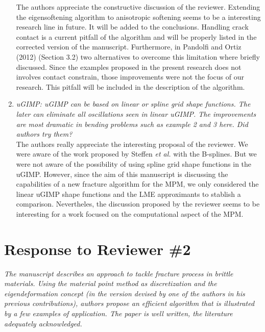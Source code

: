 \documentclass[12pt]{article}
\begin{document}
\begin{enumerate}
The authors appreciate the constructive discussion of the reviewer. Extending the eigensoftening algorithm to anisotropic softening seems to be a interesting research line in future. It will be added to the conclusions. Handling crack contact is a current pitfall of the algorithm and will be properly listed in the corrected version of the manuscript. Furthermore, in Pandolfi and Ortiz (2012) \cite{Ortiz_Pandolfi_2012} (Section 3.2) two alternatives to overcome this limitation where briefly discussed. Since the examples proposed in the present research does not involves contact constrain, those improvements were not the focus of our research. This pitfall will be included in the description of the algorithm. 

\item \textit{uGIMP: uGIMP can be based on linear or spline grid shape functions. The later can eliminate all oscillations seen in linear uGIMP. The improvements are most dramatic in bending problems such as example 2 and 3 here. Did authors try them?}\\

The authors really appreciate the interesting proposal of the reviewer. We were aware of the work proposed by Steffen {\it et al.} \cite{Steffen_2008} with the B-splines. But we were not aware of the possibility of using spline grid shape functions in the uGIMP. However, since the aim of this manuscript is  discussing the capabilities of a new fracture algorithm for the MPM, we only considered the linear uGIMP shape functions and the LME approximants to stablish a comparison. Nevertheles, the discussion proposed by the reviewer seems to be interesting for a work focused on the computational aspect of the MPM.

 \end{enumerate}

\hspace{5mm}



\section*{Response to Reviewer \#2}

\textit {The manuscript describes an approach to tackle fracture process in brittle materials. Using the material point method as discretization and the eigendeformation concept (in the version devised by one of the authors in his previous contributions), authors propose an efficient algorithm that is illustrated by a few examples of application. The paper is well written, the literature adequately acknowledged. }\\
\end{document}

